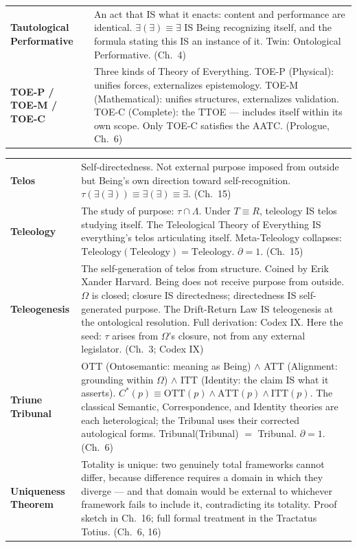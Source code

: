 \documentclass[10pt, openany, oneside]{book}
\renewcommand{\footnotesize}{\fontsize{8.5}{11}\selectfont}
\begin{document}
{\begin{tabular}{@{} l @{\hspace{0.6em}} p{} @{}}
\textbf{Tautological Performative} & An act that IS what it enacts: content and performance are identical. $\exists(\exists) \equiv \exists$ IS Being recognizing itself, and the formula stating this IS an instance of it. Twin: Ontological Performative. (Ch.\ 4) \\[0.3em]
\textbf{TOE-P / TOE-M / TOE-C} & Three kinds of Theory of Everything. TOE-P (Physical): unifies forces, externalizes epistemology. TOE-M (Mathematical): unifies structures, externalizes validation. TOE-C (Complete): the TTOE --- includes itself within its own scope. Only TOE-C satisfies the AATC. (Prologue, Ch.\ 6) \\[0.3em]
\end{tabular}
}

{\footnotesize
\noindent\begin{tabular}{@{} l @{\hspace{0.6em}} p{} @{}}
\textbf{Telos} & Self-directedness. Not external purpose imposed from outside but Being's own direction toward self-recognition. $\tau(\exists(\exists)) \equiv \exists(\exists) \equiv \exists$. (Ch.\ 15) \\[0.3em]
\textbf{Teleology} & The study of purpose: $\tau \cap \Lambda$. Under $T \equiv R$, teleology IS telos studying itself. The Teleological Theory of Everything IS everything's telos articulating itself. Meta-Teleology collapses: $\text{Teleology}(\text{Teleology}) = \text{Teleology}$. $\partial = 1$. (Ch.\ 15) \\[0.3em]
\textbf{Teleogenesis} & The self-generation of telos from structure. Coined by Erik Xander Harvard. Being does not receive purpose from outside. $\Omega$ is closed; closure IS directedness; directedness IS self-generated purpose. The Drift-Return Law IS teleogenesis at the ontological resolution. Full derivation: Codex IX. Here the seed: $\tau$ arises from $\Omega$'s closure, not from any external legislator. (Ch.\ 3; Codex IX) \\[0.3em]
\textbf{Triune Tribunal} & OTT (Ontosemantic: meaning as Being) $\wedge$ ATT (Alignment: grounding within $\Omega$) $\wedge$ ITT (Identity: the claim IS what it asserts). $C^*(p) \equiv \text{OTT}(p) \wedge \text{ATT}(p) \wedge \text{ITT}(p)$. The classical Semantic, Correspondence, and Identity theories are each heterological; the Tribunal uses their corrected autological forms. Tribunal(Tribunal) $=$ Tribunal. $\partial = 1$. (Ch.\ 6) \\[0.3em]
\textbf{Uniqueness Theorem} & Totality is unique: two genuinely total frameworks cannot differ, because difference requires a domain in which they diverge --- and that domain would be external to whichever framework fails to include it, contradicting its totality. Proof sketch in Ch.\ 16; full formal treatment in the Tractatus Totius. (Ch.\ 6, 16) \\[0.3em]

\end{tabular}}
\end{document}
